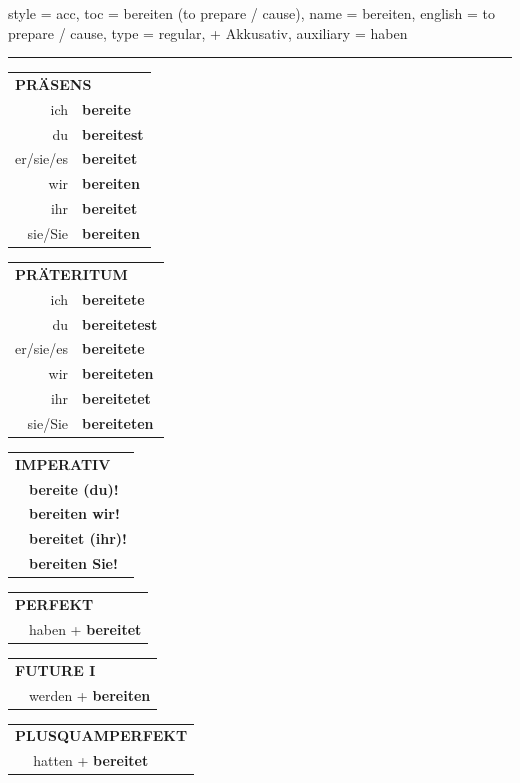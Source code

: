 \begin{verbentry}{
  style = {acc},
  toc = {bereiten (to prepare / cause)},
  name = {bereiten},
  english = {to prepare / cause},
  type = {regular, + Akkusativ},
  auxiliary = {haben}
}


\vspace{5pt}
\hrule
\vspace{5pt}

\begin{tabular}{rl}
\multicolumn{2}{l}{\textbf{PRÄSENS}}\\
ich & \textbf{bereite}\\
du & \textbf{bereitest}\\
er/sie/es & \textbf{bereitet}\\
wir & \textbf{bereiten}\\
ihr & \textbf{bereitet}\\
sie/Sie & \textbf{bereiten}\\
\end{tabular}
\hfill
\begin{tabular}{rl}
\multicolumn{2}{l}{\textbf{PRÄTERITUM}}\\
ich & \textbf{bereitete}\\
du & \textbf{bereitetest}\\
er/sie/es & \textbf{bereitete}\\
wir & \textbf{bereiteten}\\
ihr & \textbf{bereitetet}\\
sie/Sie & \textbf{bereiteten}\\
\end{tabular}
\hfill
\begin{tabular}{rl}
\multicolumn{2}{l}{\textbf{IMPERATIV}}\\
& \textbf{bereite (du)!}\\
& \textbf{bereiten wir!}\\
& \textbf{bereitet (ihr)!}\\
& \textbf{bereiten Sie!}\\
\end{tabular}

\vspace{10pt}

\begin{tabular}{rl}
\multicolumn{2}{l}{\textbf{PERFEKT}}\\
& haben + \textbf{bereitet}\\
\end{tabular}
\hfill
\begin{tabular}{rl}
\multicolumn{2}{l}{\textbf{FUTURE I}}\\
& werden + \textbf{bereiten}\\
\end{tabular}
\hfill
\begin{tabular}{rl}
\multicolumn{2}{l}{\textbf{PLUSQUAMPERFEKT}}\\
& hatten + \textbf{bereitet}\\
\end{tabular}


\end{verbentry}
